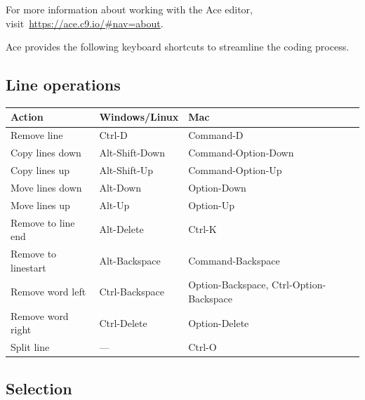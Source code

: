 \documentclass[
]{book}
\begin{document}
For more information about working with the Ace editor, visit~\url{https://ace.c9.io/\#nav=about}.

Ace provides the following keyboard shortcuts to streamline the coding process.

\hypertarget{line-operations}{%
\subsection{Line operations}\label{line-operations}}

\begin{longtable}[]{@{}lll@{}}
\toprule
Action & Windows/Linux & Mac \\
\midrule
\endhead
Remove line & Ctrl-D & Command-D \\
Copy lines down & Alt-Shift-Down & Command-Option-Down \\
Copy lines up & Alt-Shift-Up & Command-Option-Up \\
Move lines down & Alt-Down & Option-Down \\
Move lines up & Alt-Up & Option-Up \\
Remove to line end & Alt-Delete & Ctrl-K \\
Remove to linestart & Alt-Backspace & Command-Backspace \\
Remove word left & Ctrl-Backspace & Option-Backspace, Ctrl-Option-Backspace \\
Remove word right & Ctrl-Delete & Option-Delete \\
Split line & --- & Ctrl-O \\
\bottomrule
\end{longtable}

\hypertarget{selection}{%
\subsection{Selection}\label{selection}}
\end{document}

